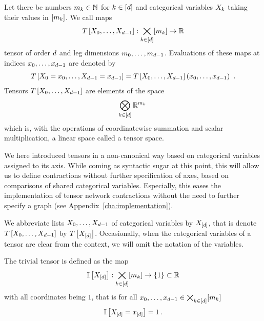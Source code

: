 \begin{definition}[Tensor]\label{def:tensor}
	Let there be numbers $m_{k}\in\mathbb{N}$ for $k\in[d]$ and categorical variables $X_{k}$ taking their values in $[m_{k}]$.
	We call maps
	\begin{align*}
		T\left[X_{0},\ldots,X_{d-1}\right] : \bigtimes_{k\in[d]} [m_{k}] \rightarrow \mathbb{R}
	\end{align*}
	tensor of order $d$ and leg dimensions $m_{0},\ldots,m_{d-1}$.
	Evaluations of these maps at indices $x_{0},\ldots,x_{d-1}$ are denoted by
	\begin{align*}
		\hypercoreat{\indexedcatvariables} = \hypercoreat{\catvariables}(\catindices) \, .
	\end{align*}	
	Tensors $T\left[X_{0},\ldots,X_{d-1}\right]$ are elements of the space
	\begin{align*}
		\bigotimes_{k\in[d]} \mathbb{R}^{m_{k}} \,  
	\end{align*}
	which is, with the operations of coordinatewise summation and scalar multiplication, a linear space called a tensor space.
\end{definition} 

We here introduced tensors in a non-canonical way based on categorical variables assigned to its axis.
While coming as syntactic sugar at this point, this will allow us to define contractions without further specification of axes, based on comparisons of shared categorical variables.
Especially, this eases the implementation of tensor network contractions without the need to further specify a graph (see Appendix~\ref{cha:implementation}).

We abbreviate lists $X_{0},\ldots,X_{d-1}$ of categorical variables by $X_{[d]}$, that is denote $T\left[X_{0},\ldots,X_{d-1}\right]$ by $T\left[X_{[d]}\right]$.
Occasionally, when the categorical variables of a tensor are clear from the context, we will omit the notation of the variables. %

\begin{example}\label{exa:trivialTensor}
	The trivial tensor is defined as the map 
		\[ \mathbb{I}\left[X_{[d]}\right] : \bigtimes_{k\in[d]}[m_{k}] \rightarrow \{1\} \subset \mathbb{R} \]
	with all coordinates being $1$, that is for all $x_{0},\ldots,x_{d-1}\in\bigtimes_{k\in[d]}[m_{k}]$
		\[ \mathbb{I}\left[X_{[d]}=x_{[d]}\right] = 1 \, . \]
\end{example}


